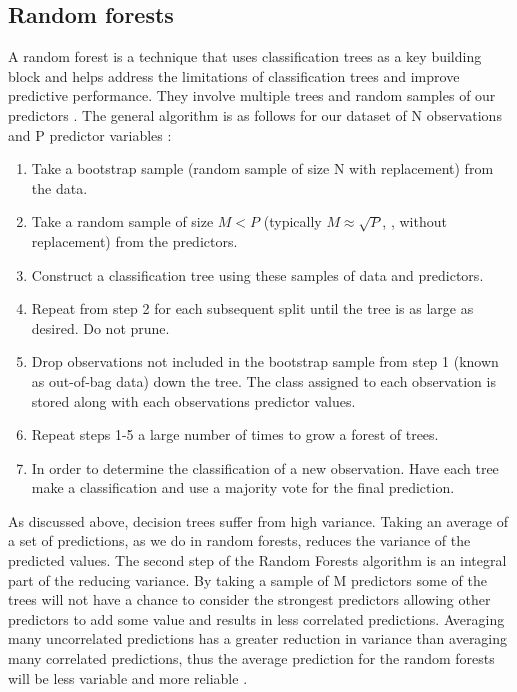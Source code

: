 \documentclass[11pt,a4paper]{article}
\begin{document}
\subsection{Random forests}

A random forest is a technique that uses classification trees as a key building block and helps address the limitations of classification trees and improve predictive performance. They involve multiple trees and random samples of our predictors \citep{berk08}.
The general algorithm is as follows for our dataset of N observations and P predictor variables \citep{berk08, varian14}:

\begin{enumerate}
  \item Take a bootstrap sample (random sample of size N with replacement) from the data.
  \item Take a random sample of size $M < P$ (typically $M \approx \sqrt{P}$, \cite{james13}, without replacement) from the predictors.
  \item Construct a classification tree using these samples of data and predictors.
  \item Repeat from step 2 for each subsequent split until the tree is as large as desired. Do not prune.
  \item Drop observations not included in the bootstrap sample from step 1 (known as out-of-bag data) down the tree. The class assigned to each observation is stored along with each observations predictor values.
  \item Repeat steps 1-5 a large number of times to grow a forest of trees.
  \item In order to determine the classification of a new observation. Have each tree make a classification and use a majority vote for the final prediction.
\end{enumerate}

As discussed above, decision trees suffer from high variance. Taking an average of a set of predictions, as we do in random forests, reduces the variance of the predicted values. The second step of the Random Forests algorithm is an integral part of the reducing variance. By taking a sample of M predictors some of the trees will not have a chance to consider the strongest predictors allowing other predictors to add some value and results in less correlated predictions. Averaging many uncorrelated predictions has a greater reduction in variance than averaging many correlated predictions, thus the average prediction for the random forests will be less variable and more reliable \citep{james13}.
\end{document}
